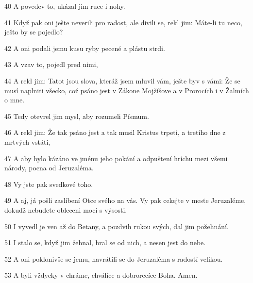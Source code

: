 \par 40 A povedev to, ukázal jim ruce i nohy.
\par 41 Když pak oni ješte neverili pro radost, ale divili se, rekl jim: Máte-li tu neco, ješto by se pojedlo?
\par 42 A oni podali jemu kusu ryby pecené a plástu strdi.
\par 43 A vzav to, pojedl pred nimi,
\par 44 A rekl jim: Tatot jsou slova, kteráž jsem mluvil vám, ješte byv s vámi: Že se musí naplniti všecko, což psáno jest v Zákone Mojžíšove a v Prorocích i v Žalmích o mne.
\par 45 Tedy otevrel jim mysl, aby rozumeli Písmum.
\par 46 A rekl jim: Že tak psáno jest a tak musil Kristus trpeti, a tretího dne z mrtvých vstáti,
\par 47 A aby bylo kázáno ve jménu jeho pokání a odpuštení hríchu mezi všemi národy, pocna od Jeruzaléma.
\par 48 Vy jste pak svedkové toho.
\par 49 A aj, já pošli zaslíbení Otce svého na vás. Vy pak cekejte v meste Jeruzaléme, dokudž nebudete obleceni mocí s výsosti.
\par 50 I vyvedl je ven až do Betany, a pozdvih rukou svých, dal jim požehnání.
\par 51 I stalo se, když jim žehnal, bral se od nich, a nesen jest do nebe.
\par 52 A oni poklonivše se jemu, navrátili se do Jeruzaléma s radostí velikou.
\par 53 A byli vždycky v chráme, chválíce a dobrorecíce Boha. Amen.


